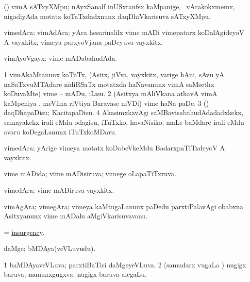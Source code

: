 \bentry
{}
\gl{\nA}
\bmng
(\birx) vimA sATxyXMpu; nAyxSanalf inUSxranfsx kaMpanige, \sA\ vArakokxmemx, nigadiyAda motatx koTaTxdadxnunx daqDhiVkarisuva sATxyXMpu. 
\emng
\eentry

\bentry
{}
\gl{\nA}
\bmng
vimedAra; vimAdAra; yAra hesarinalilx vime mADi vimepatarx koDalAgideyoV A vayxkitx; vimeya parxyoVjana paDeyuva vayxkitx. 
\emng
\eentry

\bentry
{}
\gl{\gu}
\bmng
vimAyoVgayx; vime mADabahudAda. 
\emng
\eentry

\bentry
{}
\gl{\sakirx}
\bmng
\bnum
\num{1} vimAkaMtanunx koTuTx, (Asitx, jiVva, vayxkitx, \mo varige hAni, sAvu yA naSaTxvuMTAdare nidiRSaTx motatxda haNavanunx vimA saMsethx koDuvaMte) vime -- mADu, iLisu. 
\num{2} (Asitxya mAliVkana athavA vimA kaMpeniya \vi, meVlina riVtiya Baravase niVDi) vime haNa paDe. 
\num{3} (\ame) daqDhapaDisu; KacitapaDisu. 
\num{4} AkasimxkavAgi saMBavisabahudAdadadxkekx, samayakekx irali eMdu odagisu, iTuTxko, havaNisiko:  maLe baMdare irali eMdu avaru koDegaLanunx iTuTxkoMDaru. 
\enum
\emng

\noindent 
\gl{\pagu}
\bmng
{} vimedAra; yArige vimeya motatx koDabeVkeMdu BadarxpaTiTxdeyoV A vayxkitx. 
\emng
\eentry

\bentry
{}
\gl{\gu}
\bmng
vime mADida; vime mADisiruva; vimege oLapaTiTxruva. 
\emng
\eentry

\bentry
{}
\gl{\nA}
\bmng
vimedAra; vime mADiruva vayxkitx. 
\emng
\eentry

\bentry
{}
\gl{\nA}
\bmng
vimAgAra; vimegAra; vimeya kaMtugaLanunx paDedu parxtiPalavAgi obabxna Asitxyanunx vime mADalu aMgiVkarisuvavanu. 
\emng
\eentry

\bentry
{}
\gl{\nA}
\bmng
= \hyperlink{insurgency}{insurgency}. 
\emng
\eentry

\bentry
{}
\gl{\nA}
\bmng
daMge; bMDAya(veVLuvudu). 
\emng
\eentry

\bentry
{}
\gl{\gu}
\bmng
\bnum
\num{1} baMDAyaveVLuva; parxtiBaTisi daMgeyeVLuva. 
\num{2} (samudarx \mo vugaLa \vi) nugigx baruva; mununxgugxva:  nugigx baruva alegaLu. 
\enum
\emng
\eentry

